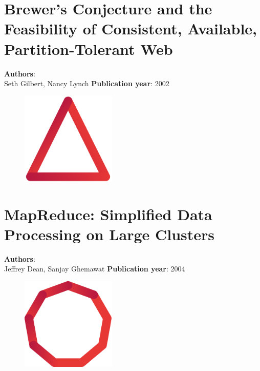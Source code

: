 \documentclass[11pt,fleqn]{book} %
\begin{document}
\chapter{Brewer’s Conjecture and the Feasibility of Consistent, Available, Partition-Tolerant Web}
\vspace*{-7mm}
\Large \textbf{Authors}: \\
Seth Gilbert, Nancy Lynch
\newline\newline
\textbf{Publication year}: 2002
\begin{figure}[b]
    \centering
    \includegraphics[width=0.4\textwidth]{distributed-systems-triangle-red.pdf}
\end{figure}


\chapter{MapReduce: Simplified Data Processing on Large Clusters}
\vspace*{-7mm}
\Large \textbf{Authors}: \\
Jeffrey Dean, Sanjay Ghemawat
\newline\newline
\textbf{Publication year}: 2004
\begin{figure}[b]
    \centering
    \includegraphics[width=0.4\textwidth]{distributed-systems-red.pdf}
\end{figure}

\end{document}
